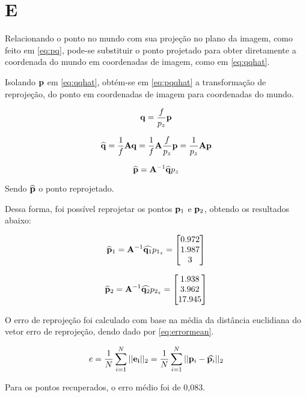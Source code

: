 \section{E}

Relacionando o ponto no mundo com sua projeção no plano da imagem, como feito em \eqref{eq:pq}, pode-se substituir o ponto projetado para obter diretamente a coordenada do mundo em coordenadas de imagem, como em \eqref{eq:qqhat}.

Isolando $\mathbf{p}$ em \eqref{eq:qqhat}, obtém-se em \eqref{eq:pqqhat} a transformação de reprojeção, do ponto em coordenadas de imagem para coordenadas do mundo.

\begin{equation}\label{eq:pq}
	\mathbf{q} = \frac{f}{p_z}\mathbf{p} 
\end{equation}

\begin{equation}\label{eq:qqhat}
	\widehat{\mathbf{q}} = \frac{1}{f}\mathbf{A} \mathbf{q}  = \frac{1}{f}\mathbf{A}\frac{f}{p_z}\mathbf{p}  = \frac{1}{p_z}\mathbf{A}\mathbf{p} 
\end{equation}

\begin{equation}\label{eq:pqqhat}
	\widehat{\mathbf{p}} = \mathbf{A}^{-1}\widehat{\mathbf{q}}p_z
\end{equation}

Sendo $\widehat{\mathbf{p}}$ o ponto reprojetado.

Dessa forma, foi possível reprojetar os pontos $\mathbf{p}_1$ e $\mathbf{p}_2$, obtendo os resultados abaixo:

\begin{equation}\label{eq:repp1}
	\widehat{\mathbf{p}}_1 = \mathbf{A}^{-1}\widehat{\mathbf{q}_1}p_{1_z} = \begin{bmatrix}
		0.972\\
		  1.987\\
		   3
	\end{bmatrix}
\end{equation}

\begin{equation}\label{eq:repp1}
	\widehat{\mathbf{p}}_2 = \mathbf{A}^{-1}\widehat{\mathbf{q}_2}p_{2_z} = \begin{bmatrix}
	1.938 \\
	 3.962 \\
	 17.945
\end{bmatrix}
\end{equation}

O erro de reprojeção foi calculado com base na média da distância euclidiana do vetor erro de reprojeção, dendo dado por \eqref{eq:errormean}.

\begin{equation}\label{eq:errormean}
	e = \frac{1}{N}\sum_{i=1}^{N}||\mathbf{e_i}||_2 = \frac{1}{N}\sum_{i=1}^{N}||\mathbf{p}_i - \widehat{\mathbf{p}_i}||_2
\end{equation}

Para os pontos recuperados, o erro médio foi de 0,083.
